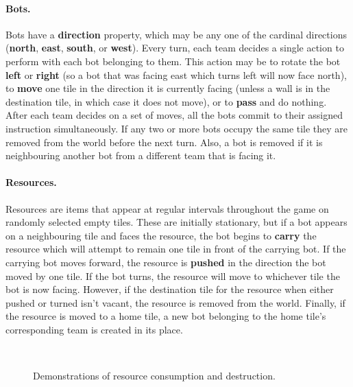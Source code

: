 \documentclass[a4paper,10pt]{article}
\begin{document}
\paragraph{Bots.}
Bots have a \textbf{direction} property, which may be any one of the cardinal directions (\textbf{north}, \textbf{east}, \textbf{south}, or \textbf{west}). Every turn, each team decides a single action to perform with each bot belonging to them. This action may be to rotate the bot \textbf{left} or \textbf{right} (so a bot that was facing east which turns left will now face north), to \textbf{move} one tile in the direction it is currently facing (unless a wall is in the destination tile, in which case it does not move), or to \textbf{pass} and do nothing. After each team decides on a set of moves, all the bots commit to their assigned instruction simultaneously. If any two or more bots occupy the same tile they are removed from the world before the next turn. Also, a bot is removed if it is neighbouring another bot from a different team that is facing it.


\paragraph{Resources.}
Resources are items that appear at regular intervals throughout the game on randomly selected empty tiles. These are initially stationary, but if a bot appears on a neighbouring tile and faces the resource, the bot begins to \textbf{carry} the resource which will attempt to remain one tile in front of the carrying bot. If the carrying bot moves forward, the resource is \textbf{pushed} in the direction the bot moved by one tile. If the bot turns, the resource will move to whichever tile the bot is now facing. However, if the destination tile for the resource when either pushed or turned isn't vacant, the resource is removed from the world. Finally, if the resource is moved to a home tile, a new bot belonging to the home tile's corresponding team is created in its place.

\begin{figure}[ht]
  \centering
  \mbox{
    \quad
  }
  \caption{Demonstrations of resource consumption and destruction.}
  \vspace{-5mm}
\end{figure}
\end{document}
